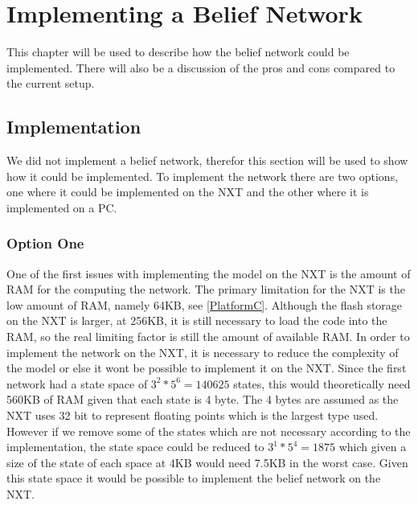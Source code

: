 \chapter{Implementing a Belief Network}
This chapter will be used to describe how the belief network could be
implemented. There will also be a discussion of the pros and cons compared to
the current setup.

\section{Implementation}

We did not implement a belief network, therefor this section will be used to
show how it could be implemented. To implement the network there are two
options, one where it could be implemented on the NXT and the other where it is
implemented on a PC.

%

\subsection{Option One}
One of the first issues with implementing the model on the NXT is the amount of
RAM for the computing the network. The primary limitation for the NXT is the
low amount of RAM, namely 64KB, see \autoref{PlatformC}. Although the flash
storage on the NXT is larger, at 256KB, it is still necessary to load the code
into the RAM, so the real limiting factor is still the amount of available RAM.
In order to implement the network on the NXT, it is necessary to reduce the
complexity of the model or else it wont be possible to implement it on the NXT.
Since the first network had a state space of $3^2*5^6 = 140625$ states, this
would theoretically need 560KB of RAM given that each state is 4 byte. The 4
bytes are assumed as the NXT uses 32 bit to represent floating points which is
the largest type used. However if we remove some of the states which are not
necessary according to the implementation, the state space could be reduced to
$3^1*5^4 = 1875$ which given a size of the state of each space at 4KB would need
7.5KB in the worst case. Given this state space it would be possible to
implement the belief network on the NXT.

